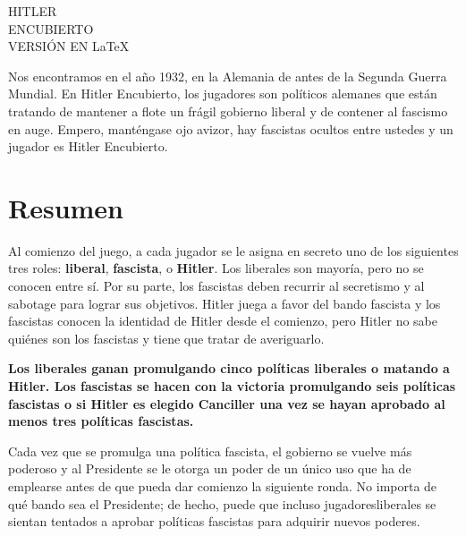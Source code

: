 \documentclass[13pt,a4paper,twocolumn,titlepage]{scrartcl}
\begin{document}
	\normalfont
	
	\begin{titlepage}
		\centering
		\vspace*{\fill}
		\fontsize{85}{85}\selectfont HITLER\\ENCUBIERTO\\
		\vspace{2cm}
		\fontsize{35}{35}\selectfont VERSIÓN EN LaTeX
		\vspace*{\fill}
	\end{titlepage}

	Nos encontramos en el año 1932, en la Alemania de antes de la Segunda Guerra Mundial. En Hitler Encubierto, los jugadores son políticos alemanes que están tratando de mantener a flote un frágil gobierno \textcolor{liberal}{liberal} y de contener al \textcolor{fascist}{fascismo} en auge. Empero, manténgase ojo avizor, hay \textcolor{fascist}{fascistas} ocultos entre ustedes y un jugador es \textcolor{fascist}{Hitler Encubierto}.
	
	\section*{Resumen}
	Al comienzo del juego, a cada jugador se le asigna en secreto uno de los siguientes tres roles: 
	\textcolor{liberal}{\textbf{liberal}}​, \textcolor{fascist}{\textbf{fascista}​}, o \textcolor{fascist}{​\textbf{Hitler}​}. Los \textcolor{liberal}{liberales} son mayoría, pero no se conocen entre sí. Por su parte, los \textcolor{fascist}{fascistas} deben recurrir al secretismo y al sabotage para lograr sus objetivos. \textcolor{fascist}{Hitler} juega a favor del bando \textcolor{fascist}{fascista} y los \textcolor{fascist}{fascistas} conocen la identidad de \textcolor{fascist}{Hitler} desde el comienzo, pero \textcolor{fascist}{Hitler} no sabe quiénes son los \textcolor{fascist}{fascistas} y tiene que tratar de averiguarlo.
	
	\textbf{Los \textcolor{liberal}{liberales} ganan promulgando cinco políticas \textcolor{liberal}{liberales} o matando a \textcolor{fascist}{​Hitler}​. Los \textcolor{fascist}{​fascistas} se hacen con la victoria promulgando seis políticas \textcolor{fascist}{​fascist​as} o si \textcolor{fascist}{​Hitler} es elegido Canciller una vez se hayan aprobado al menos tres políticas \textcolor{fascist}{​fascistas}.}
	
	Cada vez que se promulga una política \textcolor{fascist}{​fascista}, el gobierno se vuelve más poderoso y al Presidente se le otorga un poder de un único uso que ha de emplearse antes de que pueda dar comienzo la siguiente ronda. No importa de qué bando sea el Presidente; de hecho, puede que incluso jugadores \textcolor{liberal}{​liberales} se sientan tentados a aprobar políticas \textcolor{fascist}{​fascistas} para adquirir nuevos poderes.
	
\end{document}
